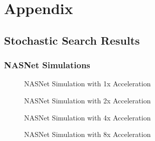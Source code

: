 \documentclass[twocolumn]{article}
\begin{document}
\section{Appendix}

\subsection{Stochastic Search Results}
\subsubsection{NASNet Simulations}


\begin{figure}
    \begin{center}
        \resizebox{\columnwidth}{!}{
             
        }
        \caption{NASNet Simulation with 1x Acceleration}
        \label{fig:nasnet_1x_acceleration}
    \end{center}
\end{figure}


\begin{figure}
    \begin{center}
        \resizebox{\columnwidth}{!}{
             
        }
        \caption{NASNet Simulation with 2x Acceleration}
        \label{fig:nasnet_2x_acceleration}
    \end{center}
\end{figure}
        
\begin{figure}
    \begin{center}
        \resizebox{\columnwidth}{!}{
            
        }
        \caption{NASNet Simulation with 4x Acceleration}
        \label{fig:nasnet_4x_acceleration}
    \end{center}
\end{figure}

\begin{figure}
    \begin{center}
        \resizebox{\columnwidth}{!}{
            
        }
        \caption{NASNet Simulation with 8x Acceleration}
        \label{fig:nasnet_8x_acceleration}
    \end{center}
\end{figure}

\FloatBarrier
\onecolumn
\end{document}
